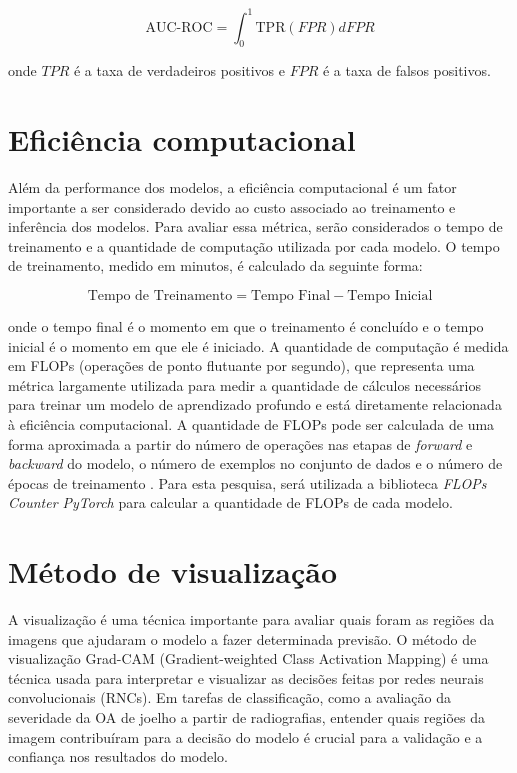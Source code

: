 \begin{equation}
    \text{AUC-ROC} = \int_{0}^{1} \text{TPR}(FPR) dFPR
\end{equation}

onde $TPR$ é a taxa de verdadeiros positivos e $FPR$ é a taxa de falsos positivos.

\section{Eficiência computacional}

Além da performance dos modelos, a eficiência computacional é um fator importante a ser considerado devido ao custo associado ao treinamento e inferência dos modelos. Para avaliar essa métrica, serão considerados o tempo de treinamento e a quantidade de computação utilizada por cada modelo. O tempo de treinamento, medido em minutos, é calculado da seguinte forma:

\begin{equation}
    \text{Tempo de Treinamento} = \text{Tempo Final} - \text{Tempo Inicial}
\end{equation}

onde o tempo final é o momento em que o treinamento é concluído e o tempo inicial é o momento em que ele é iniciado. A quantidade de computação é medida em FLOPs (operações de ponto flutuante por segundo), que representa uma métrica largamente utilizada para medir a quantidade de cálculos necessários para treinar um modelo de aprendizado profundo e está diretamente relacionada à eficiência computacional. A quantidade de FLOPs pode ser calculada de uma forma aproximada a partir do número de operações nas etapas de \textit{forward} e \textit{backward} do modelo, o número de exemplos no conjunto de dados e o número de épocas de treinamento \cite{Lohn2022}. Para esta pesquisa, será utilizada a biblioteca \textit{FLOPs Counter PyTorch} \cite{ptflops} para calcular a quantidade de FLOPs de cada modelo.

\section{Método de visualização}

A visualização é uma técnica importante para avaliar quais foram as regiões da imagens que ajudaram o modelo a fazer determinada previsão. O método de visualização Grad-CAM (Gradient-weighted Class Activation Mapping) é uma técnica usada para interpretar e visualizar as decisões feitas por redes neurais convolucionais (RNCs). Em tarefas de classificação, como a avaliação da severidade da OA de joelho a partir de radiografias, entender quais regiões da imagem contribuíram para a decisão do modelo é crucial para a validação e a confiança nos resultados do modelo.

